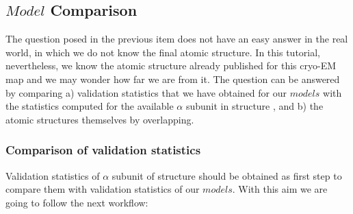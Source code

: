  \subsection*{$Model$ Comparison}
 
 The question posed in the previous item does not have an easy answer in the real world, in which we do not know the final atomic structure. In this tutorial, nevertheless, we know the atomic structure already published for this cryo-EM map and we may wonder how far we are from it. The question can be answered by comparing a) validation statistics that we have obtained for our $models$ with the statistics computed for the available $\alpha$ subunit in  structure , and b) the atomic structures themselves by overlapping.
    
  \subsubsection*{Comparison of validation statistics}
  
  Validation statistics of  $\alpha$ subunit of  structure  should be obtained as first step to compare them with validation statistics of our $models$. With this aim we are going to follow the next workflow:
  
